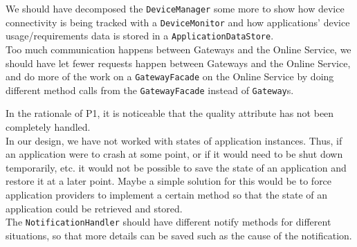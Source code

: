     We should have decomposed the \texttt{DeviceManager} some more to show how device connectivity is being tracked with a \texttt{DeviceMonitor} and how
    applications' device usage/requirements data is stored in a \texttt{ApplicationDataStore}.\\

    Too much communication happens between Gateways and the Online Service, we should have let fewer requests happen between Gateways and the Online Service,
    and do more of the work on a \texttt{GatewayFacade} on the Online Service by doing different method calls from the \texttt{GatewayFacade} instead of \texttt{Gateway}s.

    In the rationale of P1, it is noticeable that the quality attribute has not been completely handled. \\

    In our design, we have not worked with states of application instances. Thus, if an application were to crash at some point, or if it would need to be shut down temporarily, etc.
    it would not be possible to save the state of an application and restore it at a later point. Maybe a simple solution for this would be to force application providers to
    implement a certain method so that the state of an application could be retrieved and stored. \\

    The \texttt{NotificationHandler} should have different notify methods for different situations, so that more details can be saved such as the cause of the notification.
